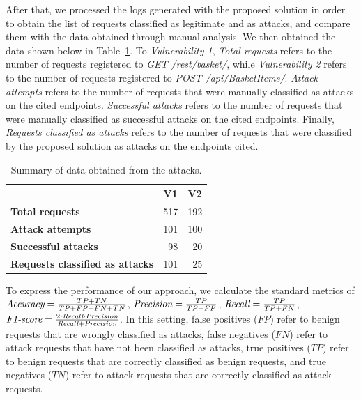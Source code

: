 After that, we processed the logs generated with the proposed solution in order to obtain the list of requests classified as legitimate and as attacks, and compare them with the data obtained through manual analysis.
We then obtained the data shown below in Table~\ref{table:attacks_summary}. To \textit{Vulnerability 1}, \textit{Total requests} refers to the number of requests registered to \textit{GET /rest/basket/}, while \textit{Vulnerability 2} refers to the number of requests registered to \textit{POST /api/BasketItems/}. \textit{Attack attempts} refers to the number of requests that were manually classified as attacks on the cited endpoints. \textit{Successful attacks} refers to the number of requests that were manually classified as successful attacks on the cited endpoints. Finally, \textit{Requests classified as attacks} refers to the number of requests that were classified by the proposed solution as attacks on the endpoints cited.

\begin{table}
\caption{Summary of data obtained from the attacks.}
\label{table:attacks_summary}
\centering
\begin{tabular}{p{} | r r}
\cline{2-3}
 & \multicolumn{1}{c}{\cellcolor{LightGray}\textsc{V1}} &  \multicolumn{1}{c}{\cellcolor{LightGray}\textsc{V2}} \\
\hline
\cellcolor{LightGray}\textbf{Total requests}                 & 517                      & 192                      \\ 
\cellcolor{LightGray}\textbf{Attack attempts}                & 101                      & 100                      \\ 
\cellcolor{LightGray}\textbf{Successful attacks}             & 98                       & 20                       \\ 
\cellcolor{LightGray}\textbf{Requests classified as attacks} & 101                      & 25                       \\
\hline
\end{tabular}
\end{table}

To express the performance of our approach, we calculate the standard metrics of $\text{\em Accuracy}=\frac{TP + TN}{TP + FP + FN + TN}$, $\text{\em Precision}=\frac{TP}{TP + FP}$, $\text{\em Recall}=\frac{TP}{TP + FN}$, $\text{\em F1-score}=\frac{2\cdot\text{\em Recall}\cdot\text{\em Precision}}{\text{\em Recall} + \text{\em Precision}}$. In this setting, false positives ($FP$) refer to benign requests that are wrongly classified as attacks, false negatives ($FN$) refer to attack requests that have not been classified as attacks, true positives ($TP$) refer to benign requests that are correctly classified as benign requests, and true negatives ($TN$) refer to attack requests that are correctly classified as attack requests.


